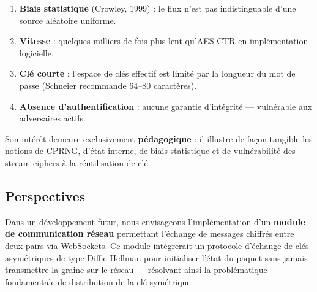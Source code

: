 \documentclass[12pt,a4paper]{article}
\begin{document}
\begin{enumerate}
    \item \textbf{Biais statistique} (Crowley, 1999) : le flux n'est pas indistinguable d'une source aléatoire uniforme.
    \item \textbf{Vitesse} : quelques milliers de fois plus lent qu'AES-CTR en implémentation logicielle.
    \item \textbf{Clé courte} : l'espace de clés effectif est limité par la longueur du mot de passe (Schneier recommande 64--80 caractères).
    \item \textbf{Absence d'authentification} : aucune garantie d'intégrité — vulnérable aux adversaires actifs.
\end{enumerate}

Son intérêt demeure exclusivement \textbf{pédagogique} : il illustre de façon tangible les notions de CPRNG, d'état interne, de biais statistique et de vulnérabilité des stream ciphers à la réutilisation de clé.

\subsection{Perspectives}
Dans un développement futur, nous envisageons l'implémentation d'un \textbf{module de communication réseau} permettant l'échange de messages chiffrés entre deux pairs via WebSockets. Ce module intégrerait un protocole d'échange de clés asymétriques de type Diffie-Hellman pour initialiser l'état du paquet sans jamais transmettre la graine sur le réseau — résolvant ainsi la problématique fondamentale de distribution de la clé symétrique.

\end{document}
